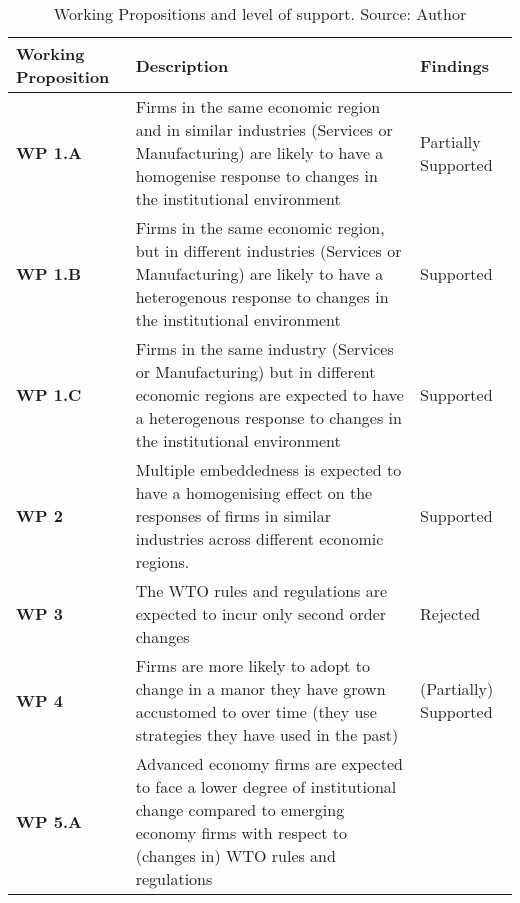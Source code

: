 \begin{table}
\centering
\caption{Working Propositions and level of support. Source: Author}\label{tab:support4WP}\renewcommand{\arraystretch}{1.333}
    \begin{tabular}{p{2.06cm}p{9.5cm}p{1.8cm}}
    \textbf{Working Proposition}  &\centering \textbf{Description}  &  \textbf{Findings}\\
     
\toprule
\textbf{WP 1.A} &%
     Firms in the same economic region and in similar industries (Services or Manufacturing) are likely to have a homogenise response to changes in the institutional environment  %
                                                     &  Partially Supported         \\
\textbf{WP 1.B} &%
    Firms in the same economic region, but in different industries (Services or Manufacturing) are likely to have a heterogenous response to changes in the institutional environment%
                                                    & Supported                       \\
\textbf{WP 1.C} &
    Firms in the same industry (Services or Manufacturing) but in different economic regions are expected to have a heterogenous response to changes in the institutional environment  
                                                    & Supported                      \\
\textbf{WP 2} &
    Multiple embeddedness is expected to have a homogenising effect on the responses of firms in similar industries across different economic regions.                          
                                                    & Supported       \\
\textbf{WP 3}&
    The WTO rules and regulations are expected to incur only second order changes        
                                                    &Rejected       \\
\textbf{WP 4}  &%
    Firms are more likely to adopt to change in a manor they have grown accustomed to over time (they use strategies they have used in the past)
                                                    & (Partially) Supported              \\
\textbf{WP 5.A} &%
    Advanced economy firms are expected to face a lower degree of institutional change compared to emerging economy firms with respect to (changes in) WTO rules and regulations                                         

\end{tabular}
\end{table}
